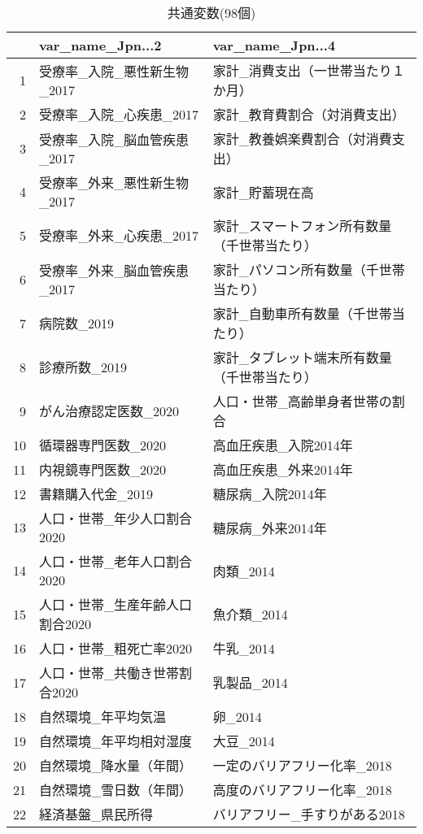 \begin{table}[ht]
\centering
\caption{共通変数(98個)} 
\label{table_commom_d2.tex}
\begingroup\tiny
\begin{tabular}{rll}
  \hline
 & var\_name\_Jpn...2 & var\_name\_Jpn...4 \\ 
  \hline
1 & 受療率\_入院\_悪性新生物\_2017 & 家計\_消費支出（一世帯当たり１か月） \\ 
  2 & 受療率\_入院\_心疾患\_2017 & 家計\_教育費割合（対消費支出） \\ 
  3 & 受療率\_入院\_脳血管疾患\_2017 & 家計\_教養娯楽費割合（対消費支出） \\ 
  4 & 受療率\_外来\_悪性新生物\_2017 & 家計\_貯蓄現在高 \\ 
  5 & 受療率\_外来\_心疾患\_2017 & 家計\_スマートフォン所有数量（千世帯当たり） \\ 
  6 & 受療率\_外来\_脳血管疾患\_2017 & 家計\_パソコン所有数量（千世帯当たり） \\ 
  7 & 病院数\_2019 & 家計\_自動車所有数量（千世帯当たり） \\ 
  8 & 診療所数\_2019 & 家計\_タブレット端末所有数量（千世帯当たり） \\ 
  9 & がん治療認定医数\_2020 & 人口・世帯\_高齢単身者世帯の割合 \\ 
  10 & 循環器専門医数\_2020 & 高血圧疾患\_入院2014年 \\ 
  11 & 内視鏡専門医数\_2020 & 高血圧疾患\_外来2014年 \\ 
  12 & 書籍購入代金\_2019 & 糖尿病\_入院2014年 \\ 
  13 & 人口・世帯\_年少人口割合2020 & 糖尿病\_外来2014年 \\ 
  14 & 人口・世帯\_老年人口割合2020 & 肉類\_2014 \\ 
  15 & 人口・世帯\_生産年齢人口割合2020 & 魚介類\_2014 \\ 
  16 & 人口・世帯\_粗死亡率2020 & 牛乳\_2014 \\ 
  17 & 人口・世帯\_共働き世帯割合2020 & 乳製品\_2014 \\ 
  18 & 自然環境\_年平均気温 & 卵\_2014 \\ 
  19 & 自然環境\_年平均相対湿度 & 大豆\_2014 \\ 
  20 & 自然環境\_降水量（年間） & 一定のバリアフリー化率\_2018 \\ 
  21 & 自然環境\_雪日数（年間） & 高度のバリアフリー化率\_2018 \\ 
  22 & 経済基盤\_県民所得 & バリアフリー\_手すりがある2018 \\ 

\end{tabular}
\end{table}
